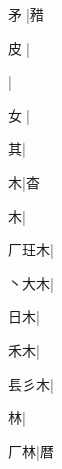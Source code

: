 \begin{multicols}{2}
{{\cjk{}{\cnsym{}　}矛{\cnxJzr{}}}\mktsJzrVerticalBar{}{\cjk{}{\cnsym{}　}{\cnsym{}　}{\cnsym{}　}}|{\cjk{}矠}\par
{\cjk{}{\cnsym{}　}皮{\cnxJzr{}}}\mktsJzrVerticalBar{}{\cjk{}{\cnsym{}　}{\cnsym{}　}{\cnsym{}　}}|{}\par
{}\mktsJzrVerticalBar{}{\cjk{}{\cnsym{}　}{\cnsym{}　}{\cnsym{}　}}|{}\par
{\cjk{}{\cnsym{}　}女{\cnxJzr{}}}\mktsJzrVerticalBar{}{\cjk{}{\cnsym{}　}{\cnsym{}　}{\cnsym{}　}}|{}\par
{\cjk{}{\cnsym{}　}{\cnsym{}　}其}\mktsJzrVerticalBar{}{\cjk{}{\cnsym{}　}{\cnsym{}　}{\cnsym{}　}}|{}\par
{\cjk{}{\cnsym{}　}{\cnsym{}　}木}\mktsJzrVerticalBar{}{\cjk{}{\cnsym{}　}{\cnsym{}　}{\cnsym{}　}}|{\cjk{}杳}\par
{\cjk{}{\cnsym{}　}{\cnsym{}　}木}\mktsJzrVerticalBar{}{\cjk{}{\cnsym{}　}{\cnsym{}　}{\cnsym{}　}}|{}\par
{\cjk{}厂玨木}\mktsJzrVerticalBar{}{\cjk{}{\cnsym{}　}{\cnsym{}　}{\cnsym{}　}}|{}\par
{\cjk{}丶大木}\mktsJzrVerticalBar{}{\cjk{}{\cnsym{}　}{\cnsym{}　}{\cnsym{}　}}|{}\par
{\cjk{}{\cnsym{}　}日木}\mktsJzrVerticalBar{}{\cjk{}{\cnsym{}　}{\cnsym{}　}{\cnsym{}　}}|{}\par
{\cjk{}{\cnsym{}　}禾木}\mktsJzrVerticalBar{}{\cjk{}{\cnsym{}　}{\cnsym{}　}{\cnsym{}　}}|{}\par
{\cjk{}镸彡木}\mktsJzrVerticalBar{}{\cjk{}{\cnsym{}　}{\cnsym{}　}{\cnsym{}　}}|{}\par
{\cjk{}{\cnsym{}　}{\cnsym{}　}林}\mktsJzrVerticalBar{}{\cjk{}{\cnsym{}　}{\cnsym{}　}{\cnsym{}　}}|{}\par
{\cjk{}{\cnsym{}　}厂林}\mktsJzrVerticalBar{}{\cjk{}{\cnsym{}　}{\cnsym{}　}{\cnsym{}　}}|{\cjk{}暦}\par
}
\end{multicols}
